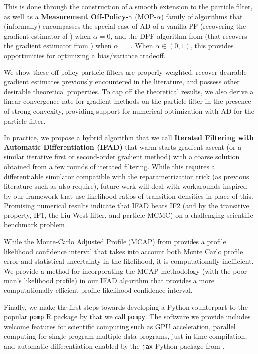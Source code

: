 \documentclass{article}
\begin{document}
This is done through the construction of a smooth extension to the particle filter, as well as a \textbf{Measurement Off-Policy-$\alpha$} (MOP-$\alpha$) family of algorithms that (informally) encompasses the special case of AD of a vanilla PF (recovering the gradient estimator of \citet{blei2018vsmc}) when $\alpha=0$, and the DPF algorithm from \citet{scibior2021dpf} (that recovers the gradient estimator from \citet{doucet2011sf}) when $\alpha=1$. When $\alpha \in (0,1)$, this provides opportunities for optimizing a bias/variance tradeoff. 

We show these off-policy particle filters are properly weighted, recover desirable gradient estimates previously encountered in the literature, and possess other desirable theoretical properties. To cap off the theoretical results, we also derive a linear convergence rate for gradient methods on the particle filter in the presence of strong convexity, providing support for numerical optimization with AD for the particle filter.

In practice, we propose a hybrid algorithm that we call \textbf{Iterated Filtering with Automatic Differentiation (IFAD)} that warm-starts gradient ascent (or a similar iterative first or second-order gradient method) with a coarse solution obtained from a few rounds of iterated filtering. While this requires a differentiable simulator compatible with the reparametrization trick (as previous literature such as \citet{corenflos2021ot} also require), future work will deal with workarounds inspired by our framework that use likelihood ratios of transition densities in place of this. Promising numerical results indicate that IFAD beats IF2 (and by the transitive property, IF1, the Liu-West filter, and particle MCMC) on a challenging scientific benchmark problem.

While the Monte-Carlo Adjusted Profile (MCAP) from \citet{Ionides_mcap} provides a profile likelihood confidence interval that takes into account both Monte Carlo profile error and statistical uncertainty in the likelihood, it is computationally inefficient.  We provide a method for incorporating the MCAP methodology (with the poor man's likelihood profile) in our IFAD algorithm that provides a more computationally efficient profile likelihood confidence interval. 

Finally, we make the first steps towards developing a Python counterpart to the popular \texttt{pomp} R package by \citet{king2016pomp, king2017pompmanual} that we call \texttt{pompy}. The software we provide includes welcome features for scientific computing such as GPU acceleration, parallel computing for single-program-multiple-data programs, just-in-time compilation, and automatic differentiation enabled by the \texttt{jax} Python package from \citet{jax2018github}. 
\end{document}
